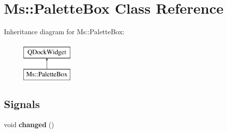 \hypertarget{class_ms_1_1_palette_box}{}\section{Ms\+:\+:Palette\+Box Class Reference}
\label{class_ms_1_1_palette_box}
Inheritance diagram for Ms\+:\+:Palette\+Box\+:\begin{figure}[H]
\begin{center}
\leavevmode
\includegraphics[height=2.000000cm]{class_ms_1_1_palette_box}
\end{center}
\end{figure}
\subsection*{Signals}
\begin{DoxyCompactItemize}
\item 
\mbox{\label{class_ms_1_1_palette_box_abb586c910c65a9a8ad0f350a6ef886a5}} 
void {\bfseries changed} ()
\end{DoxyCompactItemize}
